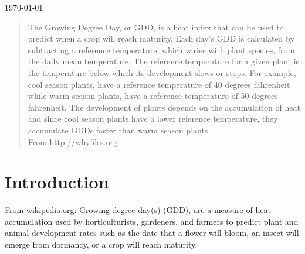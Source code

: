 \begin{titlepage}


{\large \today}\\[2cm] %



 




\vfill %

\end{titlepage}

\begin{abstract}
The Growing Degree Day, or GDD, is a heat index that can be used to predict when a crop will reach maturity. Each day’s GDD is calculated by subtracting a reference temperature, which varies with plant species, from the daily mean temperature.
The reference temperature for a given plant is the temperature below which its development slows or stops. For example, cool season plants, have a reference temperature of 40 degrees fahrenheit while warm season plants, have a reference temperature of 50 degrees fahrenheit.
The development of plants depends on the accumulation of heat and since cool season plants have a lower reference temperature, they accumulate GDDs faster than warm season plants.\\
From http://whyfiles.org 
\end{abstract}

\section{Introduction}

From wikipedia.org: Growing degree day(s) (GDD), are a measure of heat accumulation used by horticulturists, gardeners, and farmers to predict plant and animal development rates such as the date that a flower will bloom, an insect will emerge from dormancy, or a crop will reach maturity.\\

